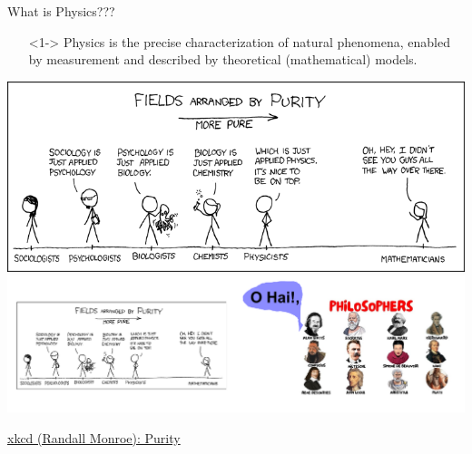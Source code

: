 \documentclass[12pt]{beamer}
\begin{document}
\begin{frame}{What is Physics???}

      \begin{itemize}
        \item[]<1-> Physics is the precise characterization of natural phenomena, enabled by measurement and described by theoretical (mathematical) models.
      \end{itemize}
      
      \vspace{1cm}

      \begin{overprint}
      \includegraphics[width=\textwidth]{images/xkcd_purity.png}
      \includegraphics[width=1.1\textwidth]{images/xkcd-purity-w-philosophers}
      \end{overprint}
      
      {\tiny \href{https://xkcd.com/435/}{xkcd (Randall Monroe): Purity}}

\end{frame}
\end{document}
